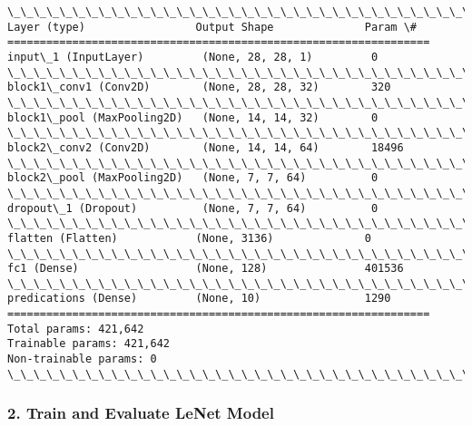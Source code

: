 \documentclass[11pt]{article}
\begin{document}
    \begin{Verbatim}[commandchars=\\\{\}]
\_\_\_\_\_\_\_\_\_\_\_\_\_\_\_\_\_\_\_\_\_\_\_\_\_\_\_\_\_\_\_\_\_\_\_\_\_\_\_\_\_\_\_\_\_\_\_\_\_\_\_\_\_\_\_\_\_\_\_\_\_\_\_\_\_
Layer (type)                 Output Shape              Param \#   
=================================================================
input\_1 (InputLayer)         (None, 28, 28, 1)         0         
\_\_\_\_\_\_\_\_\_\_\_\_\_\_\_\_\_\_\_\_\_\_\_\_\_\_\_\_\_\_\_\_\_\_\_\_\_\_\_\_\_\_\_\_\_\_\_\_\_\_\_\_\_\_\_\_\_\_\_\_\_\_\_\_\_
block1\_conv1 (Conv2D)        (None, 28, 28, 32)        320       
\_\_\_\_\_\_\_\_\_\_\_\_\_\_\_\_\_\_\_\_\_\_\_\_\_\_\_\_\_\_\_\_\_\_\_\_\_\_\_\_\_\_\_\_\_\_\_\_\_\_\_\_\_\_\_\_\_\_\_\_\_\_\_\_\_
block1\_pool (MaxPooling2D)   (None, 14, 14, 32)        0         
\_\_\_\_\_\_\_\_\_\_\_\_\_\_\_\_\_\_\_\_\_\_\_\_\_\_\_\_\_\_\_\_\_\_\_\_\_\_\_\_\_\_\_\_\_\_\_\_\_\_\_\_\_\_\_\_\_\_\_\_\_\_\_\_\_
block2\_conv2 (Conv2D)        (None, 14, 14, 64)        18496     
\_\_\_\_\_\_\_\_\_\_\_\_\_\_\_\_\_\_\_\_\_\_\_\_\_\_\_\_\_\_\_\_\_\_\_\_\_\_\_\_\_\_\_\_\_\_\_\_\_\_\_\_\_\_\_\_\_\_\_\_\_\_\_\_\_
block2\_pool (MaxPooling2D)   (None, 7, 7, 64)          0         
\_\_\_\_\_\_\_\_\_\_\_\_\_\_\_\_\_\_\_\_\_\_\_\_\_\_\_\_\_\_\_\_\_\_\_\_\_\_\_\_\_\_\_\_\_\_\_\_\_\_\_\_\_\_\_\_\_\_\_\_\_\_\_\_\_
dropout\_1 (Dropout)          (None, 7, 7, 64)          0         
\_\_\_\_\_\_\_\_\_\_\_\_\_\_\_\_\_\_\_\_\_\_\_\_\_\_\_\_\_\_\_\_\_\_\_\_\_\_\_\_\_\_\_\_\_\_\_\_\_\_\_\_\_\_\_\_\_\_\_\_\_\_\_\_\_
flatten (Flatten)            (None, 3136)              0         
\_\_\_\_\_\_\_\_\_\_\_\_\_\_\_\_\_\_\_\_\_\_\_\_\_\_\_\_\_\_\_\_\_\_\_\_\_\_\_\_\_\_\_\_\_\_\_\_\_\_\_\_\_\_\_\_\_\_\_\_\_\_\_\_\_
fc1 (Dense)                  (None, 128)               401536    
\_\_\_\_\_\_\_\_\_\_\_\_\_\_\_\_\_\_\_\_\_\_\_\_\_\_\_\_\_\_\_\_\_\_\_\_\_\_\_\_\_\_\_\_\_\_\_\_\_\_\_\_\_\_\_\_\_\_\_\_\_\_\_\_\_
predications (Dense)         (None, 10)                1290      
=================================================================
Total params: 421,642
Trainable params: 421,642
Non-trainable params: 0
\_\_\_\_\_\_\_\_\_\_\_\_\_\_\_\_\_\_\_\_\_\_\_\_\_\_\_\_\_\_\_\_\_\_\_\_\_\_\_\_\_\_\_\_\_\_\_\_\_\_\_\_\_\_\_\_\_\_\_\_\_\_\_\_\_

    \end{Verbatim}

    \subsubsection{2. Train and Evaluate LeNet
Model}\label{train-and-evaluate-lenet-model}
\end{document}
